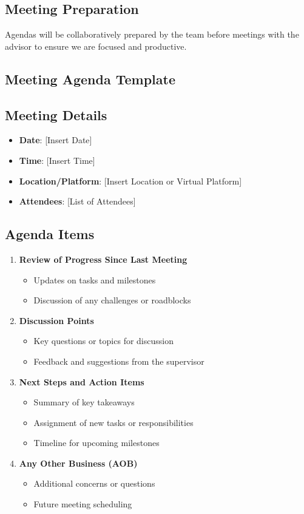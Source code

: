 \documentclass{article}
\begin{document}
\subsection*{Meeting Preparation}

Agendas will be collaboratively prepared by the team before meetings with the advisor to 
ensure we are focused and productive.

\subsection{Meeting Agenda Template}

\subsection*{Meeting Details}

\begin{itemize}
    \item \textbf{Date}: [Insert Date]
    \item \textbf{Time}: [Insert Time]
    \item \textbf{Location/Platform}: [Insert Location or Virtual Platform]
    \item \textbf{Attendees}: [List of Attendees]
\end{itemize}

\subsection*{Agenda Items}

\begin{enumerate}
    \item \textbf{Review of Progress Since Last Meeting}
    \begin{itemize}
        \item Updates on tasks and milestones
        \item Discussion of any challenges or roadblocks
    \end{itemize}
    \item \textbf{Discussion Points}
    \begin{itemize}
        \item Key questions or topics for discussion
        \item Feedback and suggestions from the supervisor
    \end{itemize}
    \item \textbf{Next Steps and Action Items}
    \begin{itemize}
        \item Summary of key takeaways
        \item Assignment of new tasks or responsibilities
        \item Timeline for upcoming milestones
    \end{itemize}
    \item \textbf{Any Other Business (AOB)}
    \begin{itemize}
        \item Additional concerns or questions
        \item Future meeting scheduling
    \end{itemize}
\end{enumerate}
\end{document}
